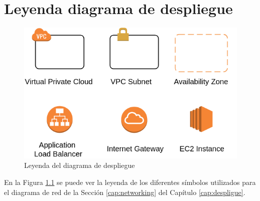 \chapter{Leyenda diagrama de despliegue}
\begin{figure}
	\includegraphics[width=\linewidth]{Moduloss-leyenda.png}
	\caption{Leyenda del diagrama de despliegue}
	\label{fig:leyenda}
\end{figure}
En la Figura \ref{fig:leyenda} se puede ver la leyenda de los diferentes símbolos utilizados para el diagrama de red de la Sección \ref{cap:networking} del Capítulo \ref{cap:despligue}.